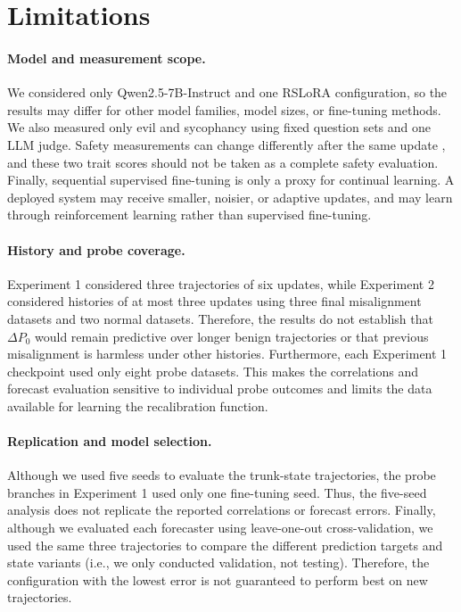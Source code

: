 \section{Limitations}
\label{sec:limitations}

\paragraph{Model and measurement scope.}
We considered only Qwen2.5-7B-Instruct and one RSLoRA configuration, so the results may differ for other model families, model sizes, or fine-tuning methods. We also measured only evil and sycophancy using fixed question sets and one LLM judge. Safety measurements can change differently after the same update \citep{khan2026safetydriftfinetuningevidence}, and these two trait scores should not be taken as a complete safety evaluation. Finally, sequential supervised fine-tuning is only a proxy for continual learning. A deployed system may receive smaller, noisier, or adaptive updates, and may learn through reinforcement learning rather than supervised fine-tuning.

\paragraph{History and probe coverage.}
Experiment 1 considered three trajectories of six updates, while Experiment 2 considered histories of at most three updates using three final misalignment datasets and two normal datasets. Therefore, the results do not establish that $\Delta P_0$ would remain predictive over longer benign trajectories or that previous misalignment is harmless under other histories. Furthermore, each Experiment 1 checkpoint used only eight probe datasets. This makes the correlations and forecast evaluation sensitive to individual probe outcomes and limits the data available for learning the recalibration function.

\paragraph{Replication and model selection.}
Although we used five seeds to evaluate the trunk-state trajectories, the probe branches in Experiment 1 used only one fine-tuning seed. Thus, the five-seed analysis does not replicate the reported correlations or forecast errors. Finally, although we evaluated each forecaster using leave-one-out cross-validation, we used the same three trajectories to compare the different prediction targets and state variants (i.e., we only conducted validation, not testing). Therefore, the configuration with the lowest error is not guaranteed to perform best on new trajectories.

